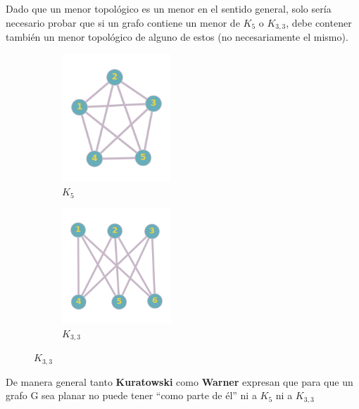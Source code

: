 \documentclass[a4paper,1pt]{report}
\begin{document}
Dado que un menor topológico es un menor en el sentido general, solo sería necesario probar que si un grafo contiene un menor de $K_5$ o  $K_{3,3}$, debe contener también un menor topológico de alguno de estos (no necesariamente el mismo).\\



\begin{figure}[H]
    \centering
    \begin{subfigure}[b]{0.45\textwidth}
        \centering
        \includegraphics[width=0.45\textwidth]{figures5/K5.png}
        \caption{$K_5$}
    \end{subfigure}
    \begin{subfigure}[b]{0.45\textwidth}
        \centering
        \includegraphics[width=0.45\textwidth]{figures5/K33.png}
        \caption{$K_{3,3}$}
    \end{subfigure}
\end{figure} 

De manera general tanto \textbf{Kuratowski} como \textbf{Warner} expresan que para que un grafo  G sea planar no puede tener ``como parte de \'el'' ni a $K_5$ ni a $K_{3,3}$ 
\end{document}

